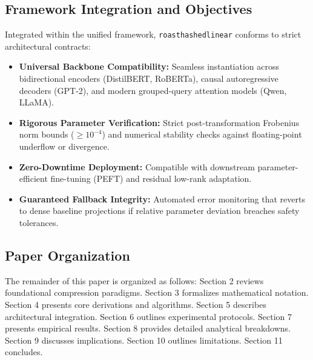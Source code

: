 \subsection{Framework Integration and Objectives}
Integrated within the unified framework, \texttt{roasthashedlinear} conforms to strict architectural contracts:
\begin{itemize}
\item \textbf{Universal Backbone Compatibility:} Seamless instantiation across bidirectional encoders (DistilBERT, RoBERTa), causal autoregressive decoders (GPT-2), and modern grouped-query attention models (Qwen, LLaMA).
\item \textbf{Rigorous Parameter Verification:} Strict post-transformation Frobenius norm bounds ($\ge 10^{-4}$) and numerical stability checks against floating-point underflow or divergence.
\item \textbf{Zero-Downtime Deployment:} Compatible with downstream parameter-efficient fine-tuning (PEFT) and residual low-rank adaptation.
\item \textbf{Guaranteed Fallback Integrity:} Automated error monitoring that reverts to dense baseline projections if relative parameter deviation breaches safety tolerances.
\end{itemize}

\subsection{Paper Organization}
The remainder of this paper is organized as follows: Section 2 reviews foundational compression paradigms. Section 3 formalizes mathematical notation. Section 4 presents core derivations and algorithms. Section 5 describes architectural integration. Section 6 outlines experimental protocols. Section 7 presents empirical results. Section 8 provides detailed analytical breakdowns. Section 9 discusses implications. Section 10 outlines limitations. Section 11 concludes.
